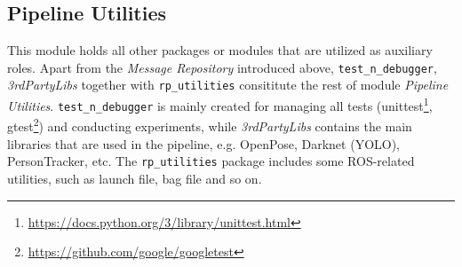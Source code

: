 \subsection{Pipeline Utilities}
This module holds all other packages or modules that are utilized as auxiliary roles. Apart from the \textit{Message Repository} introduced above, \texttt{test\_n\_debugger}, \textit{3rdPartyLibs} together with \texttt{rp\_utilities} consititute the rest of module \textit{Pipeline Utilities}. \texttt{test\_n\_debugger} is mainly created for managing all tests (unittest\footnote{\url{https://docs.python.org/3/library/unittest.html}}, gtest\footnote{\url{https://github.com/google/googletest}}) and conducting experiments, while \textit{3rdPartyLibs} contains the main libraries that are used in the pipeline, e.g. OpenPose, Darknet (YOLO), PersonTracker, etc. The \texttt{rp\_utilities} package includes some ROS-related utilities, such as launch file, bag file and so on.
